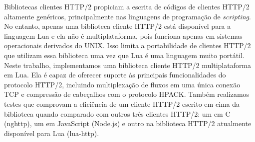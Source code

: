 
\begin{resumo} 
Bibliotecas clientes HTTP/2 propiciam a escrita de códigos de clientes HTTP/2 altamente genéricos, principalmente nas linguagens de programação de {\em scripting}. No entanto, apenas uma biblioteca cliente HTTP/2 está disponível para a linguagem Lua e ela não é multiplataforma, pois funciona apenas em sistemas operacionais derivados do UNIX. Isso limita a portabilidade de clientes HTTP/2 que utilizam essa biblioteca uma vez que Lua é uma linguagem muito portátil. Neste trabalho, implementamos uma biblioteca cliente HTTP/2 multiplataforma em Lua. Ela é capaz de oferecer suporte às principais funcionalidades do protocolo HTTP/2, incluindo multiplexação de fluxos em uma única conexão TCP e compressão de cabeçalhos com o protocolo HPACK. Também realizamos testes que comprovam a eficiência de um cliente HTTP/2 escrito em cima da biblioteca quando comparado com outros três clientes HTTP/2: um em C (nghttp), um em JavaScript (Node.js) e outro na biblioteca HTTP/2 atualmente disponível para Lua (lua-http).
\end{resumo}


